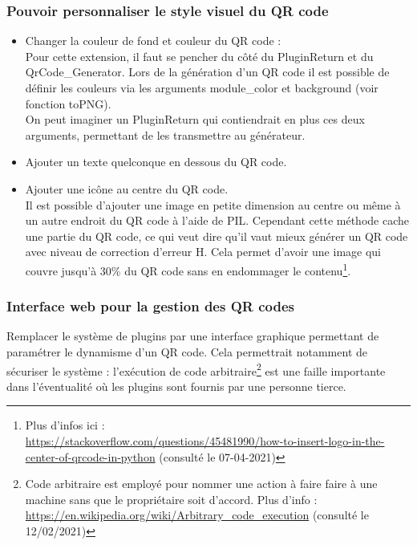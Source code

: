 \documentclass[a4paper,12pt]{article}
\begin{document}
\subsubsection{Pouvoir personnaliser le style visuel du QR code}

    \begin{itemize}
        \item Changer la couleur de fond et couleur du QR code :\\
        Pour cette extension, il faut se pencher du côté du PluginReturn et du QrCode\_Generator. Lors de la génération d'un QR code il est possible de définir les couleurs via les arguments module\_color et background (voir fonction toPNG).\\ On peut imaginer un PluginReturn qui contiendrait en plus ces deux arguments, permettant de les transmettre au générateur.\\
        \item Ajouter un texte quelconque en dessous du QR code.\\
        \item Ajouter une icône au centre du QR code.\\
        Il est possible d'ajouter une image en petite dimension au centre ou même à un autre endroit du QR code à l'aide de PIL. Cependant cette méthode cache une partie du QR code, ce qui veut dire qu'il vaut mieux générer un QR code avec niveau de correction d'erreur H. Cela permet d'avoir une image qui couvre jusqu'à 30\% du QR code sans en endommager le contenu\footnote{Plus d'infos ici :\\ \url{https://stackoverflow.com/questions/45481990/how-to-insert-logo-in-the-center-of-qrcode-in-python} (consulté le 07-04-2021)}.\\ 
    \end{itemize}
\subsubsection{Interface web pour la gestion des QR codes}
    
\noindent Remplacer le système de plugins par une interface graphique permettant de paramétrer le dynamisme d'un QR code. Cela permettrait notamment de sécuriser le système : l'exécution de code arbitraire\footnote{Code arbitraire est employé pour nommer une action à faire faire à une machine sans que le propriétaire soit d'accord. Plus d'info : \url{https://en.wikipedia.org/wiki/Arbitrary\_code\_execution} (consulté le 12/02/2021)} est une faille importante dans l'éventualité où les plugins sont fournis par une personne tierce.\\
\end{document}
